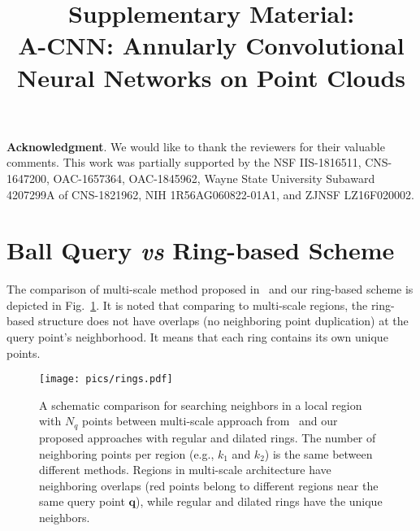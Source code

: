 \documentclass[10pt,twocolumn,letterpaper]{article}
\begin{document}
\vspace{1mm}
\noindent
\textbf{Acknowledgment}. We would like to thank the reviewers for their valuable comments. This work was partially supported by the NSF IIS-1816511, CNS-1647200, OAC-1657364, OAC-1845962, Wayne State University Subaward 4207299A of CNS-1821962, NIH 1R56AG060822-01A1, and ZJNSF LZ16F020002.
{\small


}

\clearpage
\pagebreak
\appendix

\title{Supplementary Material:\\A-CNN: Annularly Convolutional Neural Networks on Point Clouds\vspace{-13mm}}
\author{}


\makeatletter
\newcommand{\settitle}{\@maketitle}
\makeatother

\maketitle


\section{Ball Query \emph{vs} Ring-based Scheme}
\label{sec:suppl_ball_vs_ring_comparison}
The comparison of multi-scale method proposed in~\cite{qi2017pointnet++} and our ring-based scheme is depicted in Fig.~\ref{fig:dilated_rings}. It is noted that comparing to multi-scale regions, the ring-based structure does not have overlaps (no neighboring point duplication) at the query point's neighborhood. It means that each ring contains its own unique points.
\vspace{-2.5mm}
\begin{figure}[h]
\begin{center}
\texttt{[image: pics/rings.pdf]}\vspace{-3.5mm}
\end{center}
\caption{A schematic comparison for searching neighbors in a local region with $N_q$ points between multi-scale approach from~\cite{qi2017pointnet++} and our proposed approaches with regular and dilated rings. The number of neighboring points per region (e.g., $k_1$ and $k_2$) is the same between different methods. Regions in multi-scale architecture have neighboring overlaps (red points belong to different regions near the same query point $\mathbf{q}$), while regular and dilated rings have the unique neighbors.
\vspace{-3.5mm}
}
\centering
\label{fig:dilated_rings}
\end{figure}
\end{document}

